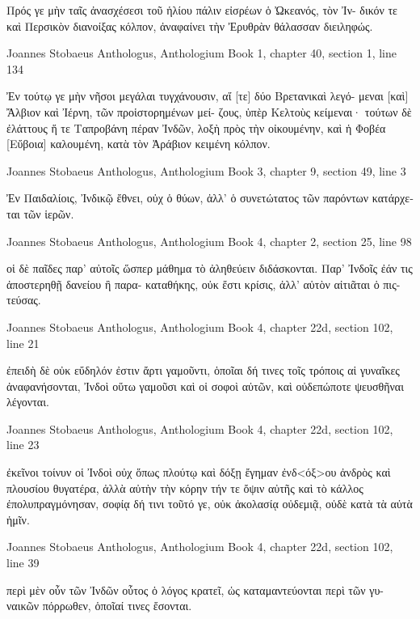 \documentclass[12pt,letterpaper,twoside,final]{memoir}
\begin{document}
\begin{greek}
                                          Πρός γε μὴν ταῖς 
ἀνασχέσεσι τοῦ ἡλίου πάλιν εἰσρέων ὁ Ὠκεανός, τὸν Ἰν-
δικόν τε καὶ Περσικὸν διανοίξας κόλπον, ἀναφαίνει τὴν 
Ἐρυθρὰν θάλασσαν διειληφώς. 



Joannes Stobaeus Anthologus, Anthologium 
Book 1, chapter 40, section 1, line 134

                                              Ἐν τούτῳ γε μὴν 
νῆσοι μεγάλαι τυγχάνουσιν, αἵ [τε] δύο Βρετανικαὶ λεγό-
μεναι [καὶ] Ἄλβιον καὶ Ἰέρνη, τῶν προἱστορημένων μεί-  
ζους, ὑπὲρ Κελτοὺς κείμεναι· τούτων δὲ ἐλάττους ἥ τε 
Ταπροβάνη πέραν Ἰνδῶν, λοξὴ πρὸς τὴν οἰκουμένην, καὶ 
ἡ Φοβέα [Εὔβοια] καλουμένη, κατὰ τὸν Ἀράβιον κειμένη 
κόλπον. 



Joannes Stobaeus Anthologus, Anthologium 
Book 3, chapter 9, section 49, line 3

Ἐν Παιδαλίοις, Ἰνδικῷ ἔθνει, οὐχ ὁ θύων, ἀλλ' ὁ 
συνετώτατος τῶν παρόντων κατάρχεται τῶν ἱερῶν. 



Joannes Stobaeus Anthologus, Anthologium 
Book 4, chapter 2, section 25, line 98

                                       οἱ δὲ παῖδες παρ' 
αὐτοῖς ὥσπερ μάθημα τὸ ἀληθεύειν διδάσκονται. 
 Παρ' Ἰνδοῖς ἐάν τις ἀποστερηθῇ δανείου ἢ παρα-
καταθήκης, οὐκ ἔστι κρίσις, ἀλλ' αὑτὸν αἰτιᾶται ὁ πις-
τεύσας. 



Joannes Stobaeus Anthologus, Anthologium 
Book 4, chapter 22d, section 102, line 21

     ἐπειδὴ δὲ οὐκ εὔδηλόν ἐστιν ἄρτι γαμοῦντι, ὁποῖαι 
δή τινες τοῖς τρόποις αἱ γυναῖκες ἀναφανήσονται, Ἰνδοὶ 
οὕτω γαμοῦσι καὶ οἱ σοφοὶ αὐτῶν, καὶ οὐδεπώποτε 
ψευσθῆναι λέγονται. 



Joannes Stobaeus Anthologus, Anthologium 
Book 4, chapter 22d, section 102, line 23

                      ἐκεῖνοι τοίνυν οἱ Ἰνδοὶ οὐχ ὅπως 
πλούτῳ καὶ δόξῃ ἔγημαν ἐνδ<όξ>ου ἀνδρὸς καὶ πλουσίου 
θυγατέρα, ἀλλὰ αὐτὴν τὴν κόρην τήν τε ὄψιν αὐτῆς καὶ 
τὸ κάλλος ἐπολυπραγμόνησαν, σοφίᾳ δή τινι τοῦτό γε, 
οὐκ ἀκολασίᾳ οὐδεμιᾷ, οὐδὲ κατὰ τὰ αὐτὰ ἡμῖν. 



Joannes Stobaeus Anthologus, Anthologium 
Book 4, chapter 22d, section 102, line 39

                                 περὶ μὲν οὖν τῶν Ἰνδῶν 
οὗτος ὁ λόγος κρατεῖ, ὡς καταμαντεύονται περὶ τῶν γυ-
ναικῶν πόρρωθεν, ὁποῖαί τινες ἔσονται. 




\end{greek}
\end{document}
